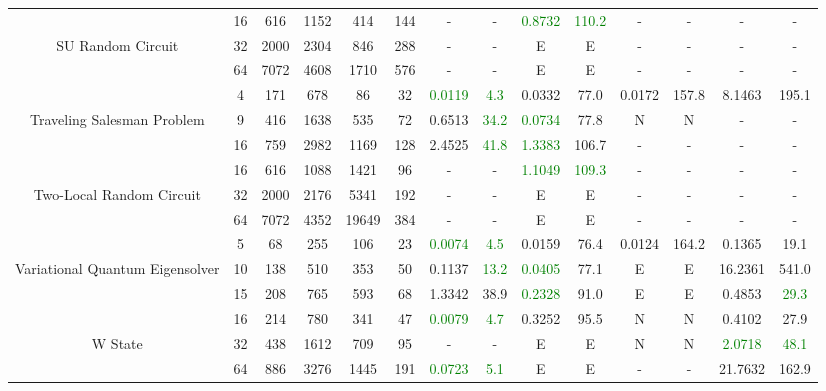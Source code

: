 \begin{table}[htb]
{\begin{tabular}{|c|c|c|c|c|c|c|c|c|c|c|c|c|c|}
\hline
 & 
16 & 616 & 1152 & 414 & 144
 & - & -
 & \textcolor{green}{0.8732} & \textcolor{green}{110.2}
 & - & -
 & - & -
 \\
SU Random Circuit & 
32 & 2000 & 2304 & 846 & 288
 & - & -
 & E & E
 & - & -
 & - & -
 \\
 & 
64 & 7072 & 4608 & 1710 & 576
 & - & -
 & E & E
 & - & -
 & - & -
 \\
\hline
 & 
4 & 171 & 678 & 86 & 32
 & \textcolor{green}{0.0119} & \textcolor{green}{4.3}
 & 0.0332 & 77.0
 & 0.0172 & 157.8
 & 8.1463 & 195.1
 \\
Traveling Salesman Problem & 
9 & 416 & 1638 & 535 & 72
 & 0.6513 & \textcolor{green}{34.2}
 & \textcolor{green}{0.0734} & 77.8
 & N & N 
 & - & -
 \\
 & 
16 & 759 & 2982 & 1169 & 128
 & 2.4525 & \textcolor{green}{41.8}
 & \textcolor{green}{1.3383} & 106.7
 & - & -
 & - & -
 \\
\hline
 & 
16 & 616 & 1088 & 1421 & 96
 & - & -
 & \textcolor{green}{1.1049} & \textcolor{green}{109.3}
 & - & -
 & - & -
 \\
Two-Local Random Circuit & 
32 & 2000 & 2176 & 5341 & 192
 & - & -
 & E & E
 & - & -
 & - & -
 \\
 & 
64 & 7072 & 4352 & 19649 & 384
 & - & -
 & E & E
 & - & -
 & - & -
 \\
\hline
 & 
5 & 68 & 255 & 106 & 23
 & \textcolor{green}{0.0074} & \textcolor{green}{4.5}
 & 0.0159 & 76.4
 & 0.0124 & 164.2
 & 0.1365 & 19.1
 \\
Variational Quantum Eigensolver & 
10 & 138 & 510 & 353 & 50
 & 0.1137 & \textcolor{green}{13.2}
 & \textcolor{green}{0.0405} & 77.1
 & E & E
 & 16.2361 & 541.0
 \\
 & 
15 & 208 & 765 & 593 & 68
 & 1.3342 & 38.9
 & \textcolor{green}{0.2328} & 91.0
 & E & E
 & 0.4853 & \textcolor{green}{29.3}
 \\
\hline
 & 
16 & 214 & 780 & 341 & 47
 & \textcolor{green}{0.0079} & \textcolor{green}{4.7}
 & 0.3252 & 95.5
 & N & N 
 & 0.4102 & 27.9
 \\
W State & 
32 & 438 & 1612 & 709 & 95
 & - & -
 & E & E
 & N & N 
 & \textcolor{green}{2.0718} & \textcolor{green}{48.1}
 \\
 & 
64 & 886 & 3276 & 1445 & 191
 & \textcolor{green}{0.0723} & \textcolor{green}{5.1}
 & E & E
 & - & -
 & 21.7632 & 162.9
 \\
\hline
\end{tabular}}
\end{table}